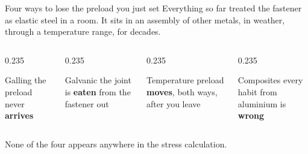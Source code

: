 \documentclass[aspectratio=169,10pt]{beamer}
\begin{document}
\begin{frame}{Four ways to lose the preload you just set}
Everything so far treated the fastener as elastic steel in a room. It sits in an assembly of other
metals, in weather, through a temperature range, for decades.
\vfill
\begin{columns}[T]
\begin{column}{0.235\textwidth}
\begin{block}{Galling}
the preload never \textbf{arrives}
\end{block}
\end{column}
\begin{column}{0.235\textwidth}
\begin{block}{Galvanic}
the joint is \textbf{eaten} from the fastener out
\end{block}
\end{column}
\begin{column}{0.235\textwidth}
\begin{block}{Temperature}
preload \textbf{moves}, both ways, after you leave
\end{block}
\end{column}
\begin{column}{0.235\textwidth}
\begin{block}{Composites}
every habit from aluminium is \textbf{wrong}
\end{block}
\end{column}
\end{columns}
\vfill
\centering
None of the four appears anywhere in the stress calculation.
\end{frame}
\end{document}
